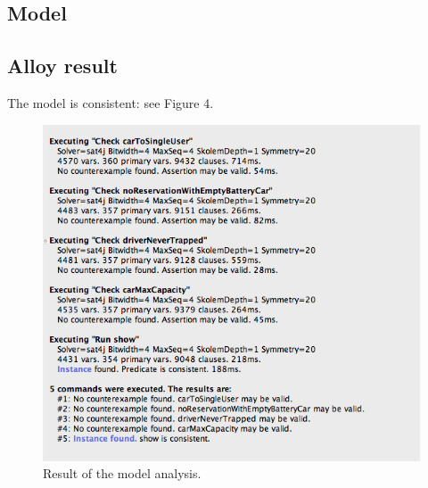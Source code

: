 \subsection{Model}


\subsection{Alloy result}
	The model is consistent: see Figure 4.
	\begin{figure}
		\includegraphics[width=\textwidth]{img/alloy_output.png}
		\caption{Result of the model analysis.}
		\label{figure 1}
	\end{figure}



